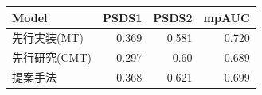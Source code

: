 \documentclass[preview,border=5pt]{standalone}
\begin{document}
\begin{table}[htbp]
 \begin{center}
   \begin{tabular}{|l|r|r|r|}
    \hline
    Model                       & PSDS1 & PSDS2 & mpAUC \\
    \hline
    先行実装(MT)  & 0.369 & 0.581 & 0.720 \\
    先行研究(CMT) & 0.297 & 0.60  & 0.689 \\
    提案手法      & 0.368 & 0.621 & 0.699 \\
    \hline
  \end{tabular}
\end{center}
\end{table}
\end{document}
